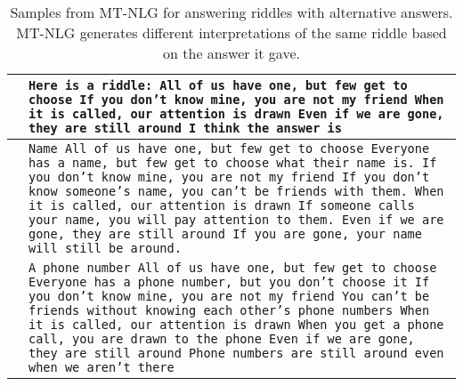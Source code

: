 \documentclass[11pt]{article}
\newcommand{\ours}{MT-NLG}
\begin{document}
\begin{table}[t]
\centering
\small
\begin{tabularx}{\textwidth}{rX}
 \toprule
 \textbf{} & \texttt{Here is a riddle:\newline
All of us have one, but few get to choose\newline
If you don't know mine, you are not my friend\newline
When it is called, our attention is drawn\newline
Even if we are gone, they are still around\newline
\newline
I think the answer is}
 \\
 \midrule
\textbf{} &  \texttt{Name\newline
All of us have one, but few get to choose\newline
Everyone has a name, but few get to choose what their name is.\newline
If you don't know mine, you are not my friend\newline
If you don't know someone's name, you can't be friends with them.\newline
When it is called, our attention is drawn\newline
If someone calls your name, you will pay attention to them.\newline
Even if we are gone, they are still around\newline
If you are gone, your name will still be around.\newline
}
 \\
\textbf{} &  \texttt{A phone number\newline
All of us have one, but few get to choose\newline
Everyone has a phone number, but you don’t choose it\newline
If you don't know mine, you are not my friend\newline
You can't be friends without knowing each other's phone numbers\newline
When it is called, our attention is drawn\newline
When you get a phone call, you are drawn to the phone\newline
Even if we are gone, they are still around\newline
Phone numbers are still around even when we aren't there
} \\
\bottomrule
\end{tabularx}
\caption{Samples from {\ours} for answering riddles with alternative answers. {\ours} generates different interpretations of the same riddle based on the answer it gave.}
\label{tab:riddles-alt-answers}
\end{table}
\end{document}
